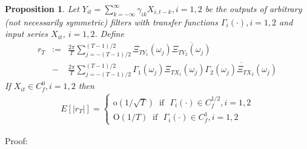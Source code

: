 \documentclass[a4paper]{book}
\newtheorem{Proposition}{Proposition}
\begin{document}
\begin{appendix}
\begin{Proposition}\label{convolution theorem}
Let \(Y_{it}=\sum_{k=-\infty}^\infty \gamma_{ik} X_{i,t-k}, i=1,2\)
be the outputs of arbitrary (not necessarily symmetric) filters with
transfer functions \(\Gamma_i(\cdot), i=1,2\) and input series
$X_{it}$, $i=1,2$.  Define
\begin{eqnarray}\label{prop1085}
r_T&:=&\frac{2\pi}{T}\sum_{j=-(T-1)/2}^{(T-1)/2}\Xi_{TY_1}(\omega_j)\overline{\Xi_{TY_2}(\omega_j)}\nonumber\\
    &-& \frac{2\pi}{T}\sum_{j=-(T-1)/2}^{(T-1)/2}\Gamma_1(\omega_j)\Xi_{TX_1}(\omega_j)
    \overline{\Gamma_2(\omega_j)\Xi_{TX_2}(\omega_j)}
    \end{eqnarray}
    If $X_{it}\in C_f^0, i=1,2$ then
\begin{eqnarray}
E[|r_T|]=\left\{\begin{array}{cc}\textrm{o}(1/\sqrt{T})~\textrm{~if~~}\Gamma_i(\cdot)\in
C_f^{1/2},i=1,2\\
\textrm{O}(1/T)~\textrm{~if~~}\Gamma_i(\cdot)\in
C_f^{1},i=1,2\end{array}\right.
\end{eqnarray}
\end{Proposition}
Proof:\\


\end{appendix}
\end{document}
